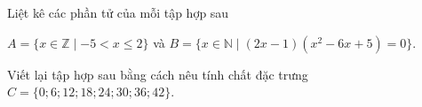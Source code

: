 \begin{bt}%
\begin{listEX}[1]
\item Liệt kê các phần tử của mỗi tập hợp sau \begin{center}
$A=\{ x\in \mathbb{Z} \mid -5<x\leq 2\}$ và 
$B=\{ x\in \mathbb{N} \mid(2x-1)(x^2-6x+5)=0\}$.
\end{center}\vspace{-1.5cm}
\item Viết lại tập hợp sau bằng cách nêu tính chất đặc trưng $C=\{ 0;6;12;18;24;30;36;42 \}$.
\end{listEX}
\end{bt}

